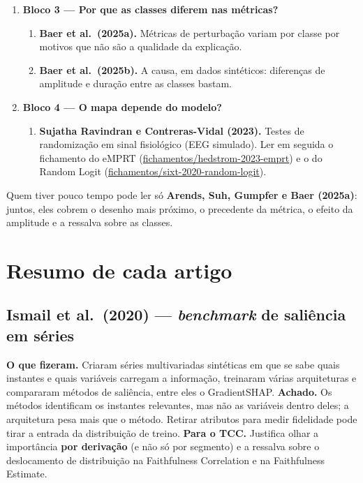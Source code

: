 \documentclass[11pt,a4paper]{article}
\begin{document}
\begin{enumerate}
\begin{enumerate}
\end{enumerate}
\item \textbf{Bloco 3 — Por que as classes diferem nas métricas?}
\begin{enumerate}
\item \textbf{Baer et al.\ (2025a).} Métricas de perturbação variam por classe por motivos que não são a qualidade da explicação.
\item \textbf{Baer et al.\ (2025b).} A causa, em dados sintéticos: diferenças de amplitude e duração entre as classes bastam.
\end{enumerate}
\item \textbf{Bloco 4 — O mapa depende do modelo?}
\begin{enumerate}
\item \textbf{Sujatha Ravindran e Contreras-Vidal (2023).} Testes de randomização em sinal fisiológico (EEG simulado). Ler em seguida o fichamento do eMPRT (\url{fichamentos/hedstrom-2023-emprt}) e o do Random Logit (\url{fichamentos/sixt-2020-random-logit}).
\end{enumerate}
\end{enumerate}
Quem tiver pouco tempo pode ler só \textbf{Arends, Suh, Gumpfer e Baer (2025a)}: juntos, eles cobrem o desenho mais próximo, o precedente da métrica, o efeito da amplitude e a ressalva sobre as classes.

\section{Resumo de cada artigo}\label{sec:resumos}

\subsection{Ismail et al.\ (2020) — \textit{benchmark} de saliência em séries}
\textbf{O que fizeram.} Criaram séries multivariadas sintéticas em que se sabe quais instantes e quais variáveis carregam a informação, treinaram várias arquiteturas e compararam métodos de saliência, entre eles o GradientSHAP. \textbf{Achado.} Os métodos identificam os instantes relevantes, mas não as variáveis dentro deles; a arquitetura pesa mais que o método. Retirar atributos para medir fidelidade pode tirar a entrada da distribuição de treino. \textbf{Para o TCC.} Justifica olhar a importância \textbf{por derivação} (e não só por segmento) e a ressalva sobre o deslocamento de distribuição na Faithfulness Correlation e na Faithfulness Estimate.
\end{document}
